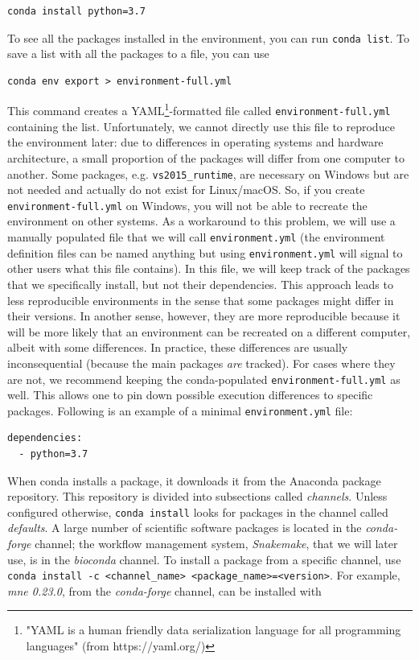 \documentclass[a4paper,man,floatsintext,natbib]{apa6}
\begin{document}
\begin{verbatim}
conda install python=3.7
\end{verbatim}

To see all the packages installed in the environment, you can run \verb|conda list|. To save a list with all the packages to a file, you can use

\begin{verbatim}
conda env export > environment-full.yml
\end{verbatim}

This command creates a YAML\footnote{"YAML is a human friendly data serialization language for all programming languages" (from https://yaml.org/)}-formatted file called \verb|environment-full.yml| containing the list. Unfortunately, we cannot directly use this file to reproduce the environment later: due to differences in operating systems and hardware architecture, a small proportion of the packages will differ from one computer to another. Some packages, e.g. \verb|vs2015_runtime|, are necessary on Windows but are not needed and actually do not exist for Linux/macOS. So, if you create \verb|environment-full.yml| on Windows, you will not be able to recreate the environment on other systems. As a workaround to this problem, we will use a manually populated file that we will call \verb|environment.yml| (the environment definition files can be named anything but using \verb|environment.yml| will signal to other users what this file contains). In this file, we will keep track of the packages that we specifically install, but not their dependencies. This approach leads to less reproducible environments in the sense that some packages might differ in their versions. In another sense, however, they are more reproducible because it will be more likely that an environment can be recreated on a different computer, albeit with some differences. In practice, these differences are usually inconsequential (because the main packages \emph{are} tracked). For cases where they are not, we recommend keeping the conda-populated \verb|environment-full.yml| as well. This allows one to pin down possible execution differences to specific packages. Following is an example of a minimal \verb|environment.yml| file:

\begin{verbatim}
dependencies:
  - python=3.7
\end{verbatim}

When conda installs a package, it downloads it from the Anaconda package repository. This repository is divided into subsections called \emph{channels}. Unless configured otherwise, \verb|conda install| looks for packages in the channel called \emph{defaults}. A large number of scientific software packages is located in the \emph{conda-forge} channel; the workflow management system, \emph{Snakemake}, that we will later use, is in the \emph{bioconda} channel. To install a package from a specific channel, use \verb|conda install -c <channel_name> <package_name>=<version>|. For example, \emph{mne 0.23.0}, from the \emph{conda-forge} channel, can be installed with
\end{document}
